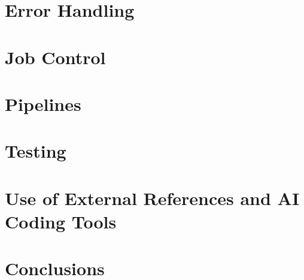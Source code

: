 \documentclass[11pt]{article}
\begin{document}
\section{Error Handling}

\section{Job Control}

\section{Pipelines}

\section{Testing}

\section{Use of External References and AI Coding Tools}

\section{Conclusions}
\end{document}
